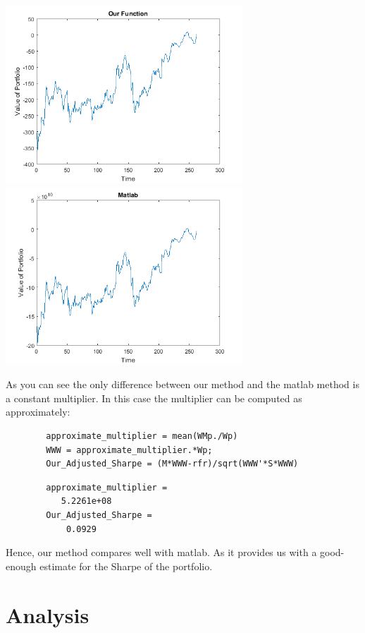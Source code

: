 \documentclass[12pt,titlepage,letter]{article}
\begin{document}
	\includegraphics [width=3.5in]{testing_01.png}\includegraphics [width=3.5in]{testing_02.png}
	\begin{par}
		As you can see the only difference between our method and the matlab method is a constant multiplier. In this case the multiplier can be computed as approximately:
	\end{par} \vspace{1em}
	\begin{verbatim}
		approximate_multiplier = mean(WMp./Wp)
		WWW = approximate_multiplier.*Wp;
		Our_Adjusted_Sharpe = (M*WWW-rfr)/sqrt(WWW'*S*WWW)
	\end{verbatim}
    \color{lightgray} \begin{verbatim}
		approximate_multiplier =
		   5.2261e+08
		Our_Adjusted_Sharpe =
		    0.0929
	\end{verbatim} \color{black}
    \begin{par}
		Hence, our method compares well with matlab. As it provides us with a good-enough estimate for the Sharpe of the portfolio.
	\end{par} \vspace{1em}

\section{Analysis}
\end{document}
